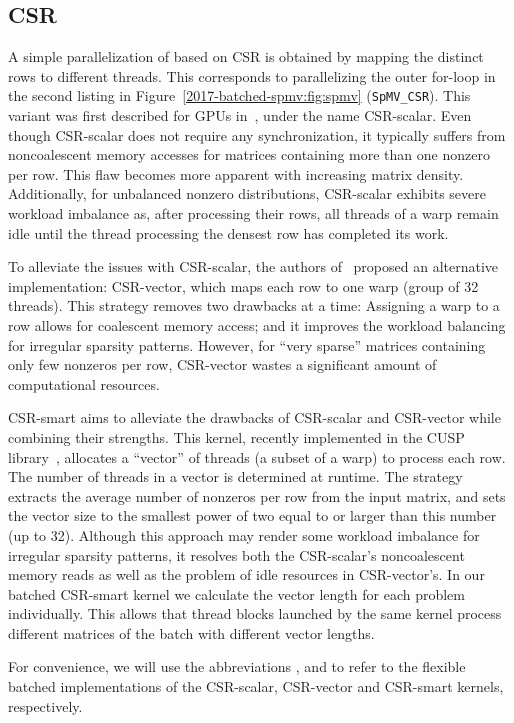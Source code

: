 \subsection{CSR}
A simple parallelization of \spmv based on CSR 
is obtained by mapping the distinct rows to different threads.
This corresponds to parallelizing the outer for-loop in the second listing
in Figure~\ref{2017-batched-spmv:fig:spmv} ({\tt SpMV\_CSR}).
This variant was first described for GPUs in~\cite{garlandspmv},
under the name CSR-scalar.
Even though CSR-scalar does not require any synchronization,
it typically suffers from noncoalescent memory accesses
for matrices containing more than one nonzero per row.
This flaw becomes more apparent with increasing matrix density.
Additionally, for unbalanced nonzero distributions,
CSR-scalar exhibits severe workload imbalance as,
after processing their rows, 
all threads of a warp remain idle until the thread processing 
the densest row has completed its work.

To alleviate the issues with CSR-scalar, the authors of~\cite{garlandspmv}
proposed an alternative implementation: CSR-vector, which
maps each row to one warp (group of 32 threads).
This strategy removes two drawbacks at a time:
Assigning a warp to a row allows for coalescent memory access;
and it improves the workload balancing for irregular sparsity patterns.
However, for ``very sparse'' matrices containing only few nonzeros per row,
CSR-vector wastes a significant amount of computational resources.

CSR-smart aims to alleviate the drawbacks of CSR-scalar and CSR-vector
while combining their strengths.
This kernel, recently implemented in the CUSP library~\cite{cusp},
allocates a ``vector'' of threads (a subset of a warp) to process each row.
The number of threads in a vector is determined at runtime.
The strategy extracts the average number of nonzeros per row from the input matrix,
and sets the vector size to the smallest power of two
equal to or larger than this number (up to 32).
Although this approach may render some workload imbalance for irregular sparsity patterns,
it resolves both the CSR-scalar's noncoalescent memory reads
as well as the problem of idle resources in CSR-vector's.
In our batched CSR-smart kernel we calculate the vector length for each problem individually.
This allows that thread blocks launched by the same kernel process
different matrices of the batch with different vector lengths.

For convenience, we will use the abbreviations \csrscal, \csrvec and \csrsmart
to refer to the flexible batched implementations of the
CSR-scalar, CSR-vector and CSR-smart kernels, respectively.

